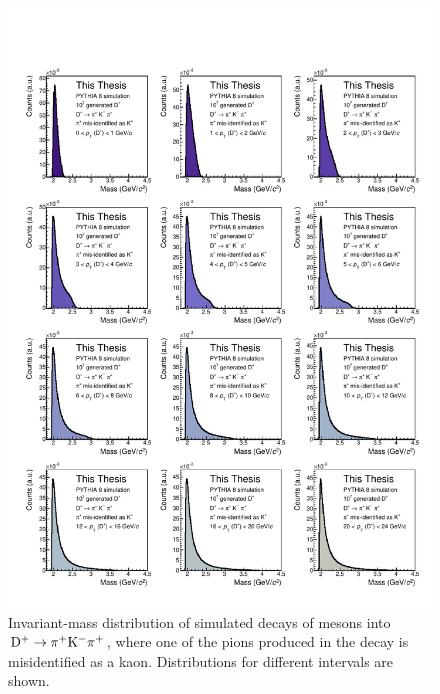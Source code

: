 \begin{figure}[htbp]
    \centering
    \includegraphics[width=\textwidth]{Figures/Chapter 5/Dplus_Corr_Bkg_simulation.pdf}
    \caption{Invariant-mass distribution of simulated decays of \dpl mesons into \mbox{$\mathrm{D^+}\rightarrow\mathrm{\pi^+K^-\pi^+}$}, where one of the pions produced in the decay is misidentified as a kaon. Distributions for different \pt intervals are shown. }
    \label{fig:DplusSimulations}
\end{figure}


